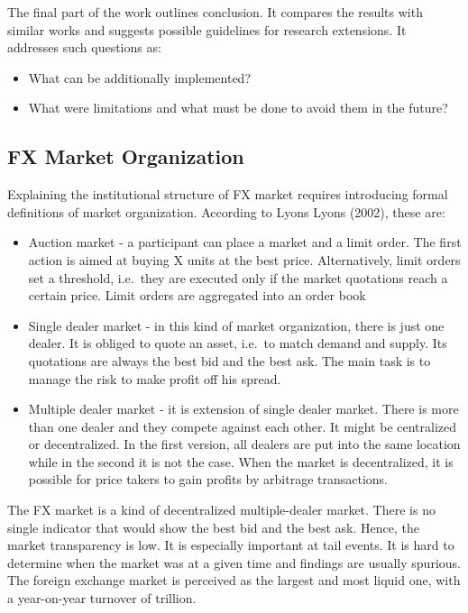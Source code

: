\documentclass[]{article}
\providecommand{\tightlist}{%
  \setlength{\itemsep}{0pt}\setlength{\parskip}{0pt}}
\begin{document}
The final part of the work outlines conclusion. It compares the results
with similar works and suggests possible guidelines for research
extensions. It addresses such questions as:

\begin{itemize}
\tightlist
\item
  What can be additionally implemented?
\item
  What were limitations and what must be done to avoid them in the
  future?
\end{itemize}

\subsection{FX Market Organization}\label{fx-market-organization}

Explaining the institutional structure of FX market requires introducing
formal definitions of market organization. According to Lyons Lyons
(2002), these are:

\begin{itemize}
\tightlist
\item
  Auction market - a participant can place a market and a limit order.
  The first action is aimed at buying X units at the best price.
  Alternatively, limit orders set a threshold, i.e.~they are executed
  only if the market quotations reach a certain price. Limit orders are
  aggregated into an order book
\item
  Single dealer market - in this kind of market organization, there is
  just one dealer. It is obliged to quote an asset, i.e.~to match demand
  and supply. Its quotations are always the best bid and the best ask.
  The main task is to manage the risk to make profit off his spread.
\item
  Multiple dealer market - it is extension of single dealer market.
  There is more than one dealer and they compete against each other. It
  might be centralized or decentralized. In the first version, all
  dealers are put into the same location while in the second it is not
  the case. When the market is decentralized, it is possible for price
  takers to gain profits by arbitrage transactions.
\end{itemize}

The FX market is a kind of decentralized multiple-dealer market. There
is no single indicator that would show the best bid and the best ask.
Hence, the market transparency is low. It is especially important at
tail events. It is hard to determine when the market was at a given time
and findings are usually spurious. The foreign exchange market is
perceived as the largest and most liquid one, with a year-on-year
turnover of  trillion.
\end{document}
